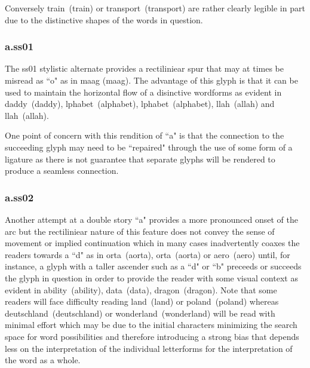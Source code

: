 Conversely
\mbox{{\ssdefault train} (train)} or
\mbox{{\ssdefault transport} (transport)}
are rather clearly legible in part due to the distinctive shapes of the words
in question.

\subsubsection{{\ssone a}.ss01}

The ss01 stylistic alternate provides a rectiliniear spur that may at times be
misread as ``o" as in \mbox{\ssdefault m{\ssone aa}g} (maag). The advantage of
this glyph is that it can be used to maintain the horizontal flow of a disinctive
wordforms as evident in
\mbox{{\ssdefault d{\ssone a}ddy} (daddy)},
\mbox{{lphabet} (alphabet)},
\mbox{{lph{\ssone a}bet} (alphabet)},
\mbox{{llah} (allah)} and
\mbox{{ll{\ssone a}h} (allah)}.

One point of concern with this rendition of ``a" is that the connection to the
succeeding glyph may need to be ``repaired" through the use of some form of a
ligature as there is not guarantee that separate glyphs will be rendered to
produce a seamless connection.

\subsubsection{{\sstwo a}.ss02}

Another attempt at a double story ``a" provides a more pronounced onset of
the arc but the rectiliniear nature of this feature does not convey the sense
of movement or implied continuation which in many cases inadvertently coaxes
the readers towards a ``d" as in
\mbox{{orta} (aorta)},
\mbox{{ort{\sstwo a}} (aorta)} or
\mbox{{\sstwo aero} (aero)}
until, for instance, a glyph with a taller ascender such as a ``d" or ``b"
preceeds or succeeds the glyph in question in order to provide the reader with
some visual context as evident in
\mbox{{\sstwo ability} (ability)},
\mbox{{\sstwo data} (data)},
\mbox{{\sstwo dragon} (dragon)}. Note that some readers will face
difficulty reading \mbox{{\sstwo land} (land)} or
\mbox{{\sstwo poland} (poland)} whereas \mbox{{\sstwo deutschland} (deutschland)} or
\mbox{{\sstwo wonderland} (wonderland)}
will be read with minimal effort which may be due to the initial
characters minimizing the search space for word possibilities and therefore
introducing a strong bias that depends less on the interpretation of the
individual letterforms for the interpretation of the word as a whole.

